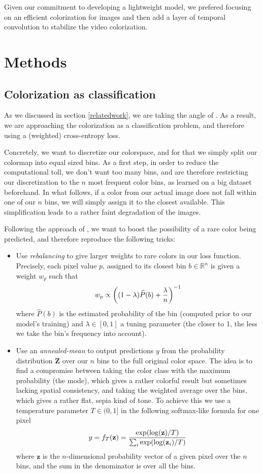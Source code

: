 \documentclass[10pt,twocolumn,letterpaper]{article}
\begin{document}
Given our commitment to developing a lightweight model, we prefered focusing on an efficient colorization for images and then add a layer of temporal convolution to stabilize the video colorization.


\section{Methods} \label{methods}

\subsection{Colorization as classification}

As we discussed in section \ref{relatedwork}, we are taking the angle of \cite{zhang2016colorful}. As a result, we are approaching the colorization as a classification problem, and therefore using a (weighted) cross-entropy loss.

Concretely, we want to discretize our colorspace, and for that we simply split our colormap into equal sized bins. As a first step, in order to reduce the computational toll, we don't want too many bins, and are therefore restricting our discretization to the $n$ most frequent color bins, as learned on a big dataset beforehand. In what follows, if a color from our actual image does not fall within one of our $n$ bins, we will simply assign it to the closest available. This simplification leads to a rather faint degradation of the images.

Following the approach of \cite{zhang2016colorful}, we want to boost the possibility of a rare color being predicted, and therefore reproduce the following tricks:
\begin{itemize}
\item Use \textit{rebalancing} to give larger weights to rare colors in our loss function. Precisely, each pixel value $p$, assigned to its closest bin $b \in \mathbb{R}^n$ is given a weight $w_p$ such that $$w_p \propto \left( (1-\lambda) \widehat{P}(b) + {\lambda \over n} \right)^{-1}$$ where $\widehat{P}(b)$ is the estimated probability of the bin (computed prior to our model's training) and $\lambda \in [0,1]$ a tuning parameter (the closer to 1, the less we take the bin's frequency into account).
\item Use an \textit{annealed-mean} to output predictions $y$ from the probability distribution $\textbf{Z}$ over our $n$ bins to the full original color space. The idea is to find a compromise between taking the color class with the maximum probability (the mode), which gives a rather colorful result but sometimes lacking spatial consistency, and taking the weighted average over the bins, which gives a rather flat, sepia kind of tone. To achieve this we use a temperature parameter $T \in (0,1]$ in the following softmax-like formula for one pixel $$y = f_T(\textbf{z}) = {\exp(\log(\textbf{z}) / T) \over \sum_i \exp(\log(\textbf{z}_i) / T)}$$ where $\textbf{z}$ is the $n$-dimensional probability vector of a given pixel over the $n$ bins, and the sum in the denominator is over all the bins.
\end{itemize}
\end{document}
